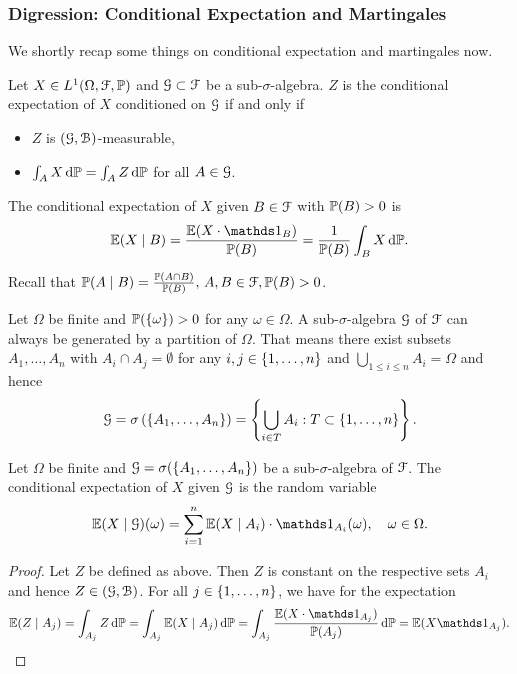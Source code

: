 \documentclass[12pt]{amsart}
\begin{document}
\subsubsection{Digression: Conditional Expectation and Martingales}
We shortly recap some things on conditional expectation and martingales now.
\begin{definition}
    Let \(X \in L^1(\Omega, \cF, \P)\) and \(\cG \subset \cF\) be a sub-\(\sigma\)-algebra. \(Z\) is the conditional expectation of \(X\) conditioned on \(\cG\) if and only if \begin{itemize}
        \item \(Z\) is \((\cG, \cB)\)-measurable,
        \item \(\intt[A][][X][\P] = \intt[A][][Z][\P]\) for all \(A \in \cG\).
    \end{itemize}
    The conditional expectation of \(X\) given \(B \in \cF\) with \(\P(B) > 0\) is \[
        \E(X \mid B) = \frac{\E(X \cdot \indic_B)}{\P(B)} = \frac{1}{\P(B)} \intt[B][][X][\P].
    \]
\end{definition}

\begin{remark}
    Recall that \(\P(A \mid B) = \frac{\P(A \cap B)}{\P(B)},\, A, B \in \cF, \P(B) > 0\).
\end{remark}
Let \(\Omega\) be finite and \(\P(\set{\omega}) > 0\) for any \(\omega \in \Omega\). A sub-\(\sigma\)-algebra \(\cG\) of \(\cF\) can always be generated by a partition of \(\Omega\). That means there exist subsets \(A_1, \dots, A_n\) with \(A_i \cap A_j = \emptyset\) for any \(i, j \in \set{1, \dots, n}\) and \(\bigcup_{1 \leq i \leq n} A_i = \Omega\) and hence \[
    \cG = \sigma\left(\set{A_1, \dots, A_n}\right) = \set{\bigcup_{i \in T} A_i: T \subset \set{1, \dots, n}}.
\]
\begin{theorem}
    Let \(\Omega\) be finite and \(\cG = \sigma(\set{A_1, \dots, A_n})\) be a sub-\(\sigma\)-algebra of \(\cF\). The conditional expectation of \(X\) given \(\cG\) is the random variable \[
        \E(X \mid \cG)(\omega) = \sum_{i=1}^n \E(X \mid A_i) \cdot \indic_{A_i}(\omega), \quad \omega \in \Omega.
    \]
\end{theorem}
\begin{proof}
    Let \(Z\) be defined as above. Then \(Z\) is constant on the respective sets \(A_i\) and hence \(Z \in (\cG, \cB)\). For all \(j \in \set{1, \dots, n}\), we have for the expectation
    \[
        \E(Z \mid A_j) = \intt[A_j][][Z][\P]
        = \intt[A_j][][\E(X \mid A_j)][\P]
        = \intt[A_j][][\frac{\E(X \cdot \indic_{A_j})}{\P(A_j)}][\P] = \E(X \indic_{A_j}).\qedhere
    \]
\end{proof}
\end{document}
